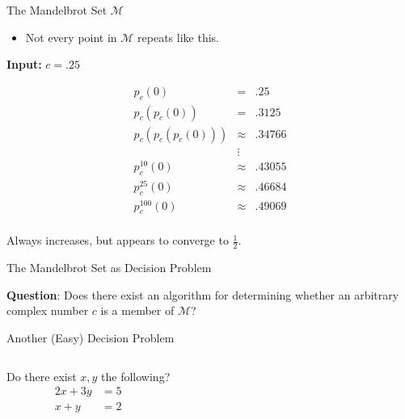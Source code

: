 \documentclass[c]{beamer}
\begin{document}
\begin{frame}{The Mandelbrot Set $\mathcal{M}$}
  
  \begin{itemize}
  \item Not every point in $\mathcal{M}$ repeats like this.
  \end{itemize}
  
  \textbf{Input:} $c = .25$

  \vspace{-\baselineskip}

  \begin{align*}
    p_c(0) &=& .25\\
    p_c(p_c(0)) &=& .3125\\
    p_c(p_c(p_c(0))) &\approx& .34766\\
    &\vdots& \\
    p_c^{10}(0) &\approx& .43055\\
    p_c^{25}(0) &\approx& .46684\\
    p_c^{100}(0) &\approx& .49069\\
  \end{align*}
  
  Always increases, but appears to converge to $\frac{1}{2}$.
  
\end{frame}

\begin{frame}{The Mandelbrot Set as Decision Problem}
  
  \textbf{Question}: Does there exist an algorithm for determining
  whether an arbitrary complex number $c$ is a member of
  $\mathcal{M}$?
  
\end{frame}

\begin{frame}{Another (Easy) Decision Problem}
  
  \begin{columns}
    
    Do there exist $x, y$ the following?
    \begin{align*}
      2x + 3y &= 5\\
      x + y &= 2
    \end{align*}


    \begin{center}
    \end{center}
  \end{columns}
\end{frame}
\end{document}
